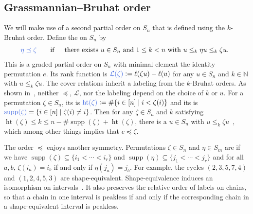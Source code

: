 \documentclass[12pt,oneside,reqno]{amsart}
\theoremstyle{definition}
\numberwithin{equation}{section}
\newcommand{\NN}{{\mathbb N}}
\newcommand{\calL}{{\mathcal L}}
\DeclareMathOperator{\het}{ht}
\DeclareMathOperator{\supp}{supp}
\newcommand{\defcolor}[1]{{\color{RoyalBlue}#1}}
\newcommand{\demph}[1]{\defcolor{{\sl #1}}}
\begin{document}
\subsection{Grassmannian--Bruhat order}\label{SS:GBO}

We will make use of a second partial order on $S_n$ that is defined using the
$k$-Bruhat order. Define the \demph{Grassmannian--Bruhat order} on $S_n$ by
%
\begin{equation*}
    \defcolor{\eta\preceq\zeta}
    \qquad\text{if}\quad
    \begin{array}{c}
        \text{there exists $u \in S_n$ and $1\leq k < n$ with $u\leq_k \eta u\leq_k\zeta u$.}
    \end{array}
\end{equation*}
This is a graded partial order on $S_n$ with minimal element the identity permutation $e$.
Its rank function is $\defcolor{\calL(\zeta)}\vcentcolon=\ell(\zeta u)-\ell(u)$ for any $u \in S_n$ and $k \in \NN$ with
$u\leq_k\zeta u$. 
The cover relations inherit a labeling from the $k$-Bruhat orders.
As shown in~\cite[Sect.~3.2]{BS-Bruhat}, neither $\preceq$, $\calL$, nor the labeling depend on the choice of $k$ or $u$.
For a permutation $\zeta\in S_n$, its \demph{height} is 
$\defcolor{\het(\zeta)} \vcentcolon= \#\{i\in[n]\mid i<\zeta(i)\}$ and its  
\demph{support} is $\defcolor{\supp(\zeta)} = \{i\in[n]\mid\zeta(i)\neq i\}$.
Then for any $\zeta \in S_n$ and $k$ satisfying $\het(\zeta)\leq k\leq n-\#\supp(\zeta)+\het(\zeta)$,
there is a $u\in S_n$ with $u\leq_k \zeta u$~\cite[Thm.~3.1.5]{BS-Bruhat},
which among other things implies that $e \preceq \zeta$.

The order $\preceq$ enjoys another symmetry.
Permutations $\zeta\in S_n$ and $\eta\in S_m$ are \demph{shape-equivalent} if we have 
$\supp(\zeta)\subseteq\{i_1<\dotsb<i_r\}$ and $\supp(\eta)\subseteq\{j_1<\dotsb<j_r\}$ and for all $a,b$, $\zeta(i_a)=i_b$
if and only if $\eta(j_a)=j_b$.
For example, the cycles  $(2,3,5,7,4)$ and $(1,2,4,5,3)$ are shape-equivalent.
Shape-equivalence %
induces an isomorphism on intervals~\cite[Thm.~3.2.3({\it v})]{BS-Bruhat}.
It also preserves the relative order of labels on chains,
so that a chain in one interval is peakless if and only if the corresponding chain in a shape-equivalent interval is peakless.
\end{document}
